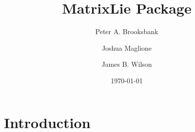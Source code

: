 \documentclass{documentation}
\title{MatrixLie Package}
\author{Peter A. Brooksbank}
\author{Joshua Maglione}
\author{James B. Wilson}
\date{\today}
\begin{document}
\frontmatter

\dominitoc
\maketitle
\tableofcontents

\mainmatter

\chapter{Introduction}
\end{document}
